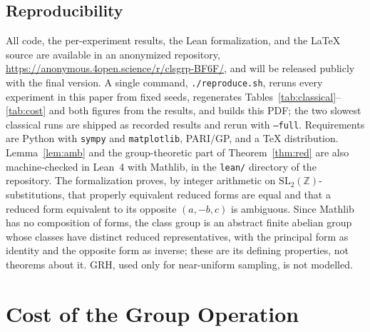 \documentclass[runningheads]{llncs}
\begin{document}
\subsection{Reproducibility}\label{sec:repro}
All code, the per-experiment results, the Lean formalization, and the LaTeX source are available in an anonymized repository, \url{https://anonymous.4open.science/r/clsgrp-BF6F/}, and will be released publicly with the final version. A single command, \texttt{./reproduce.sh}, reruns every experiment in this paper from fixed seeds, regenerates Tables~\ref{tab:classical}--\ref{tab:cost} and both figures from the results, and builds this PDF; the two slowest classical runs are shipped as recorded results and rerun with \texttt{--full}. Requirements are Python with \texttt{sympy} and \texttt{matplotlib}, PARI/GP, and a TeX distribution. Lemma~\ref{lem:amb} and the group-theoretic part of Theorem~\ref{thm:red} are also machine-checked in Lean~4 with Mathlib, in the \texttt{lean/} directory of the repository. The formalization proves, by integer arithmetic on $\mathrm{SL}_2(\mathbb{Z})$-substitutions, that properly equivalent reduced forms are equal and that a reduced form equivalent to its opposite $(a,-b,c)$ is ambiguous. Since Mathlib has no composition of forms, the class group is an abstract finite abelian group whose classes have distinct reduced representatives, with the principal form as identity and the opposite form as inverse; these are its defining properties, not theorems about it. GRH, used only for near-uniform sampling, is not modelled.

\section{Cost of the Group Operation}\label{sec:cost}
\end{document}
